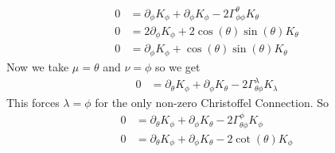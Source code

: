 \documentclass[11pt]{article}
\numberwithin{equation}{section}
\begin{document}
\begin{enumerate}[(a)]
\begin{align*}
0 &= \partial_{\phi}K_{\phi} + \partial_{\phi}K_{\phi} - 2\Gamma^{\theta}_{\phi\phi}K_{\theta}\\
0 &= 2\partial_{\phi}K_{\phi} + 2\cos(\theta)\sin(\theta)K_{\theta}\\
0 &= \partial_{\phi}K_{\phi} + \cos(\theta)\sin(\theta)K_{\theta}
\end{align*}
Now we take $\mu=\theta$ and $\nu=\phi$ so we get
\begin{align*}
0 &= \partial_{\theta}K_{\phi} + \partial_{\phi}K_{\theta} - 2\Gamma^{\lambda}_{\theta\phi}K_{\lambda}
\end{align*}
This forces $\lambda = \phi$ for the only non-zero Christoffel Connection. So
\begin{align*}
0 &= \partial_{\theta}K_{\phi} + \partial_{\phi}K_{\theta} - 2\Gamma^{\phi}_{\theta\phi}K_{\phi}\\
0 &= \partial_{\theta}K_{\phi} + \partial_{\phi}K_{\theta} - 2\cot(\theta)K_{\phi}
\end{align*}


\end{enumerate}
\end{document}
